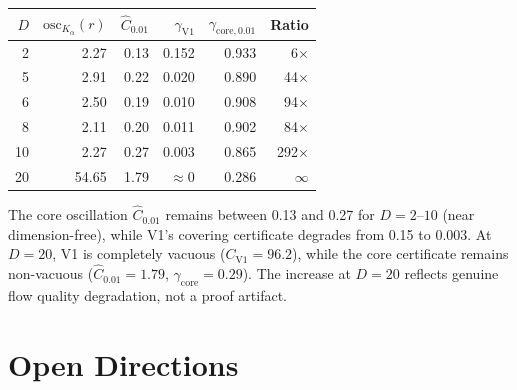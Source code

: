 \documentclass[11pt]{article}
\newcommand{\osc}{\mathrm{osc}}
\begin{document}
\medskip
\begin{center}
\begin{tabular}{rrrrrr}
\hline
$D$ & $\osc_{K_\alpha}(r)$ & $\hat{C}_{0.01}$ & $\gamma_{\mathrm{V1}}$ & $\gamma_{\mathrm{core},0.01}$ & Ratio \\
\hline
2  & 2.27 & 0.13 & 0.152 & 0.933 & 6$\times$ \\
5  & 2.91 & 0.22 & 0.020 & 0.890 & 44$\times$ \\
6  & 2.50 & 0.19 & 0.010 & 0.908 & 94$\times$ \\
8  & 2.11 & 0.20 & 0.011 & 0.902 & 84$\times$ \\
10 & 2.27 & 0.27 & 0.003 & 0.865 & 292$\times$ \\
20 & 54.65 & 1.79 & $\approx 0$ & 0.286 & $\infty$ \\
\hline
\end{tabular}
\end{center}

\medskip
\noindent The core oscillation $\hat{C}_{0.01}$ remains between 0.13 and 0.27 for $D = 2$--$10$ (near dimension-free), while V1's covering certificate degrades from 0.15 to 0.003. At $D=20$, V1 is completely vacuous ($C_{\mathrm{V1}} = 96.2$), while the core certificate remains non-vacuous ($\hat{C}_{0.01} = 1.79$, $\gamma_{\mathrm{core}} = 0.29$). The increase at $D=20$ reflects genuine flow quality degradation, not a proof artifact.


\section{Open Directions}
\end{document}
